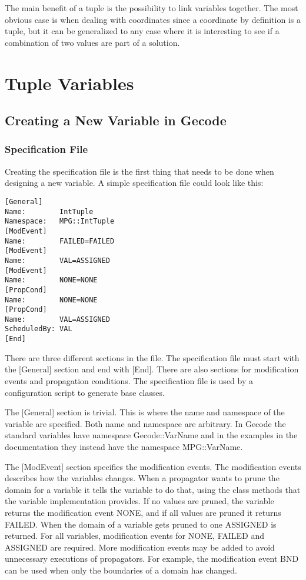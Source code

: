 \documentclass[a4paper,11pt]{article}
\begin{document}
The main benefit of a tuple is the possibility to link variables together. The most obvious case is when dealing with coordinates since a coordinate by definition is a tuple, but it can be generalized to any case where it is interesting to see if a combination of two values are part of a solution.

\newpage
\section{Tuple Variables}

\subsection{Creating a New Variable in Gecode}
\subsubsection{Specification File}
Creating the specification file is the first thing that needs to be done when designing a new variable.  A simple specification file could look like this:

\begin{lstlisting}[frame=single]
[General]
Name:        IntTuple
Namespace:   MPG::IntTuple
[ModEvent]
Name:        FAILED=FAILED
[ModEvent]
Name:        VAL=ASSIGNED
[ModEvent]
Name:        NONE=NONE
[PropCond]
Name:        NONE=NONE
[PropCond]
Name:        VAL=ASSIGNED
ScheduledBy: VAL
[End]
\end{lstlisting}

There are three different sections in the file. The specification file must start with the [General] section and end with [End]. There are also sections for modification events and propagation conditions. The specification file is used by a configuration script to generate base classes.

The [General] section is trivial. This is where the name and namespace of the variable are specified. Both name and namespace are arbitrary. In Gecode the standard variables have namespace Gecode::VarName and in the examples in the documentation they instead have the namespace MPG::VarName.

The [ModEvent] section specifies the modification events. The modification events describes how the variables changes. When a propagator wants to prune the domain for a variable it tells the variable to do that, using the class methods that the variable implementation provides. If no values are pruned, the variable returns the modification event NONE, and if all values are pruned it returns FAILED. When the domain of a variable gets pruned to one ASSIGNED is returned. For all variables, modification events for NONE, FAILED and ASSIGNED are required. More modification events may be added to avoid unnecessary executions of propagators. For example, the modification event BND can be used when only the boundaries of a domain has changed.
\end{document}
